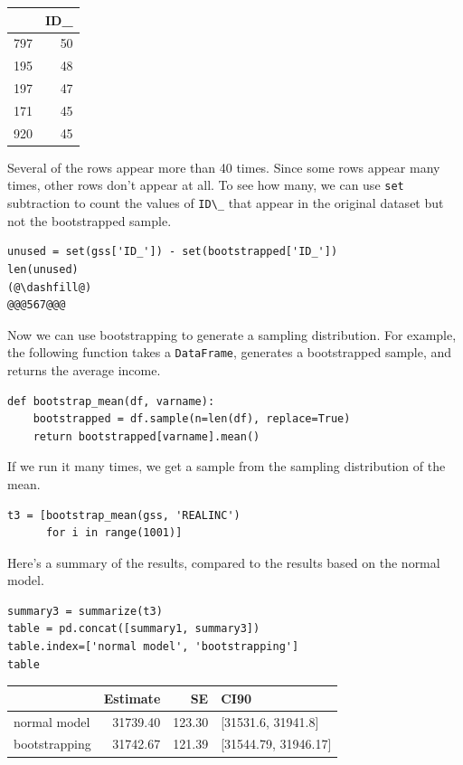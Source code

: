 \begin{tabular}{lr}
\midrule
{} &  ID\_ \\
\midrule
797 &   50 \\
195 &   48 \\
197 &   47 \\
171 &   45 \\
920 &   45 \\
\midrule
\end{tabular}

Several of the rows appear more than 40 times. Since some rows appear
many times, other rows don't appear at all. To see how many, we can use
\passthrough{\lstinline!set!} subtraction to count the values of
\passthrough{\lstinline!ID\_!} that appear in the original dataset but
not the bootstrapped sample.

\begin{lstlisting}[]
unused = set(gss['ID_']) - set(bootstrapped['ID_'])
len(unused)
(@\dashfill@)
@@@567@@@
\end{lstlisting}

Now we can use bootstrapping to generate a sampling distribution. For
example, the following function takes a
\passthrough{\lstinline!DataFrame!}, generates a bootstrapped sample,
and returns the average income.

\begin{lstlisting}[]
def bootstrap_mean(df, varname):
    bootstrapped = df.sample(n=len(df), replace=True)
    return bootstrapped[varname].mean()
\end{lstlisting}

If we run it many times, we get a sample from the sampling distribution
of the mean.

\begin{lstlisting}[]
t3 = [bootstrap_mean(gss, 'REALINC')
      for i in range(1001)]
\end{lstlisting}

Here's a summary of the results, compared to the results based on the
normal model.

\begin{lstlisting}[]
summary3 = summarize(t3)
table = pd.concat([summary1, summary3])
table.index=['normal model', 'bootstrapping']
table
\end{lstlisting}

\begin{tabular}{lrrl}
\midrule
{} &  Estimate &      SE &                  CI90 \\
\midrule
normal model  &  31739.40 &  123.30 &    [31531.6, 31941.8] \\
bootstrapping &  31742.67 &  121.39 &  [31544.79, 31946.17] \\
\midrule
\end{tabular}

